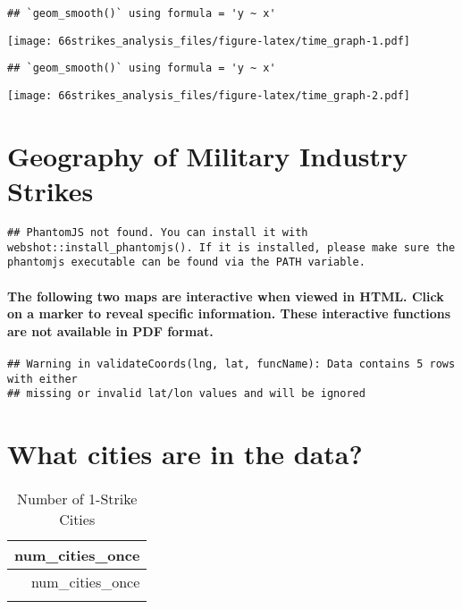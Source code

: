 \documentclass[
]{article}
\begin{document}
\begin{verbatim}
## `geom_smooth()` using formula = 'y ~ x'
\end{verbatim}

\texttt{[image: 66strikes\_analysis\_files/figure-latex/time\_graph-1.pdf]}

\begin{verbatim}
## `geom_smooth()` using formula = 'y ~ x'
\end{verbatim}

\texttt{[image: 66strikes\_analysis\_files/figure-latex/time\_graph-2.pdf]}

\newpage

\section{Geography of Military Industry
Strikes}\label{geography-of-military-industry-strikes}

\begin{verbatim}
## PhantomJS not found. You can install it with webshot::install_phantomjs(). If it is installed, please make sure the phantomjs executable can be found via the PATH variable.
\end{verbatim}

\paragraph{The following two maps are interactive when viewed in HTML.
Click on a marker to reveal specific information. These interactive
functions are not available in PDF
format.}\label{the-following-two-maps-are-interactive-when-viewed-in-html.-click-on-a-marker-to-reveal-specific-information.-these-interactive-functions-are-not-available-in-pdf-format.}

\begin{verbatim}
## Warning in validateCoords(lng, lat, funcName): Data contains 5 rows with either
## missing or invalid lat/lon values and will be ignored
\end{verbatim}

\section{What cities are in the
data?}\label{what-cities-are-in-the-data}

\begin{longtable}[]{@{}r@{}}
\caption{Number of 1-Strike Cities}\tabularnewline
\toprule\noalign{}
num\_cities\_once \\
\midrule\noalign{}
\endfirsthead
\toprule\noalign{}
num\_cities\_once \\
\midrule\noalign{}
\endhead
\bottomrule\noalign{}
\endlastfoot
65 \\
\end{longtable}
\end{document}
